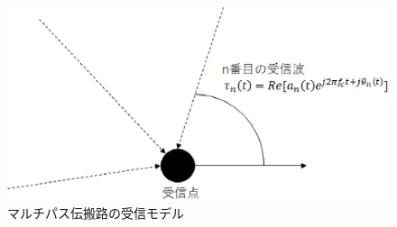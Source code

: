 \begin{figure}[h]
	\begin{center}
		\includegraphics[width=0.7\linewidth]{chapter2/figure/jushin.eps}
		\caption{マルチパス伝搬路の受信モデル}
		\label{fig:coming_waves}
	\end{center}
\end{figure}

